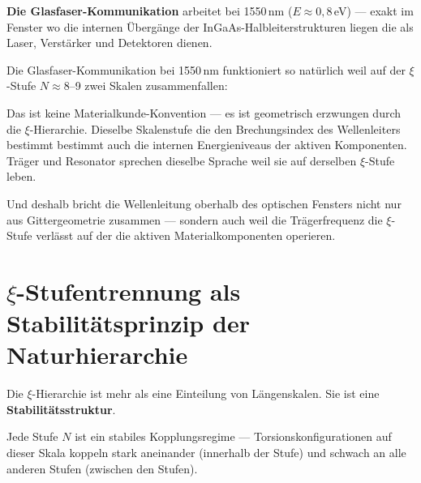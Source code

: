 \textbf{Die Glasfaser-Kommunikation}
arbeitet bei 1550\,nm ($E \approx 0{,}8$\,eV) ---
exakt im Fenster wo die internen Übergänge
der InGaAs-Halbleiterstrukturen liegen
die als Laser, Verstärker und Detektoren dienen.

\begin{keyresult}
Die Glasfaser-Kommunikation bei 1550\,nm funktioniert
so natürlich weil auf der $\xi$-Stufe $N \approx 8$--9
zwei Skalen zusammenfallen:

\begin{center}
\end{center}

Das ist keine Materialkunde-Konvention ---
es ist geometrisch erzwungen durch die $\xi$-Hierarchie.
Dieselbe Skalenstufe die den Brechungsindex
des Wellenleiters bestimmt bestimmt auch
die internen Energieniveaus der aktiven Komponenten.
Träger und Resonator sprechen dieselbe Sprache
weil sie auf derselben $\xi$-Stufe leben.

Und deshalb bricht die Wellenleitung oberhalb
des optischen Fensters nicht nur aus Gittergeometrie
zusammen --- sondern auch weil die Trägerfrequenz
die $\xi$-Stufe verlässt auf der die aktiven
Materialkomponenten operieren.
\end{keyresult}

\section{\texorpdfstring{$\xi$}{xi}-Stufentrennung als Stabilitätsprinzip
  der Naturhierarchie}
\label{sec:stufentrennung}

Die $\xi$-Hierarchie ist mehr als eine Einteilung
von Längenskalen. Sie ist eine
\textbf{Stabilitätsstruktur}.

Jede Stufe $N$ ist ein stabiles Kopplungsregime ---
Torsionskonfigurationen auf dieser Skala koppeln
stark aneinander (innerhalb der Stufe)
und schwach an alle anderen Stufen
(zwischen den Stufen).

